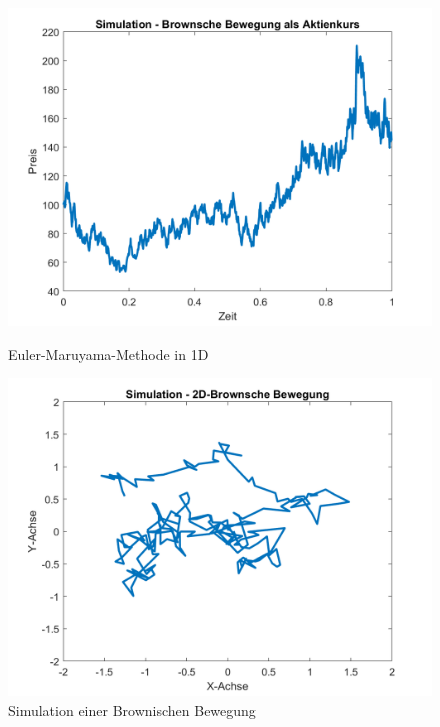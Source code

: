 \begin{figure}
	\centering
	\begin{minipage}{0.45\textwidth}
		\centering
		\includegraphics[width=\linewidth]{papers/brown/images/Aktienkurs-als-Brownische-Bewegung_2.png}
		\caption{Euler-Maruyama-Methode in 1D}
	\end{minipage}
	\hspace{0.05\linewidth}
	\begin{minipage}{0.45\textwidth}
		\centering
		\includegraphics[width=\linewidth]{papers/brown/images/Brownische-Bewegung-Simuliert_2.png}
		\caption{Simulation einer Brownischen Bewegung}
	\end{minipage}
\end{figure}

